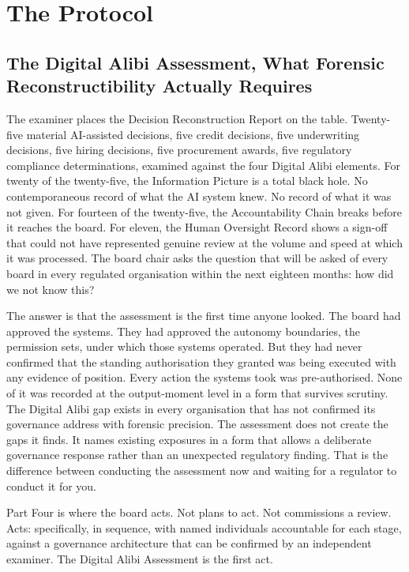 
\part{The Protocol}

\chapter{The Digital Alibi Assessment, What Forensic Reconstructibility Actually Requires}

The examiner places the Decision Reconstruction Report on the table. Twenty-five material AI-assisted decisions, five credit decisions, five underwriting decisions, five hiring decisions, five procurement awards, five regulatory compliance determinations, examined against the four Digital Alibi elements. For twenty of the twenty-five, the Information Picture is a total black hole. No contemporaneous record of what the AI system knew. No record of what it was not given. For fourteen of the twenty-five, the Accountability Chain breaks before it reaches the board. For eleven, the Human Oversight Record shows a sign-off that could not have represented genuine review at the volume and speed at which it was processed. The board chair asks the question that will be asked of every board in every regulated organisation within the next eighteen months: how did we not know this?

The answer is that the assessment is the first time anyone looked. The board had approved the systems. They had approved the autonomy boundaries, the permission sets, under which those systems operated. But they had never confirmed that the standing authorisation they granted was being executed with any evidence of position. Every action the systems took was pre-authorised. None of it was recorded at the output-moment level in a form that survives scrutiny. The Digital Alibi gap exists in every organisation that has not confirmed its governance address with forensic precision. The assessment does not create the gaps it finds. It names existing exposures in a form that allows a deliberate governance response rather than an unexpected regulatory finding. That is the difference between conducting the assessment now and waiting for a regulator to conduct it for you.

Part Four is where the board acts. Not plans to act. Not commissions a review. Acts: specifically, in sequence, with named individuals accountable for each stage, against a governance architecture that can be confirmed by an independent examiner. The Digital Alibi Assessment is the first act.


